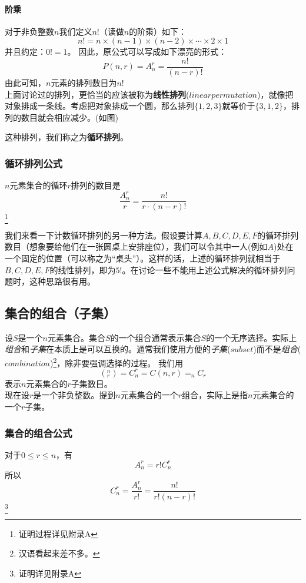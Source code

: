 \documentclass{ctexart}
\begin{document}
    \paragraph{阶乘} 对于非负整数$n$我们定义$n!$（读做$n$的阶乘）如下：
    \[n! = n \times (n-1) \times (n-2) \times \cdots \times 2 \times 1\]
    并且约定：$0! = 1$。
    因此，原公式可以写成如下漂亮的形式：
    \[P(n,r) = A_n^r = \frac{n!}{(n-r)!}\]
    由此可知，$n$元素的排列数目为$n!$\\
    上面讨论过的排列，更恰当的应该被称为\textbf{线性排列}($linear permutation$)，就像把对象排成一条线。考虑把对象排成一个圆，那么排列$\{1,2,3\}$就等价于$\{3,1,2\}$，排列的数目就会相应减少。(如图)
    \begin{center}
    \end{center}
    这种排列，我们称之为\textbf{循环排列}。
   \subsubsection{循环排列公式}
   $n$元素集合的循环$r$排列的数目是
   \[\frac{A_n^r}{r} = \frac{n!}{r \cdot (n-r)!}\]
   \footnote{证明过程详见附录A}

   我们来看一下计数循环排列的另一种方法。假设要计算$A,B,C,D,E,F$的循环排列数目（想象要给他们在一张圆桌上安排座位），我们可以令其中一人(例如$A$)处在一个固定的位置（可以称之为“桌头”）。这样的话，上述的循环排列就相当于$B,C,D,E,F$的线性排列，即为$5!$。在讨论一些不能用上述公式解决的循环排列问题时，这种思路很有用。


   \subsection{集合的组合（子集）}
   设$S$是一个$n$元素集合。集合$S$的一个组合通常表示集合$S$的一个无序选择。实际上\textit{组合}和\textit{子集}在本质上是可以互换的。通常我们使用方便的\textit{子集}($subset$)而不是\textit{组合}($combination$)\footnote{汉语看起来差不多。}，除非要强调选择的过程。
   我们用
   \[(_r^n) = C_n^r = C(n,r) = _nC_r\]
   表示$n$元素集合的$r$子集数目。\\
   现在设$r$是一个非负整数。提到$n$元素集合的一个$r$组合，实际上是指$n$元素集合的一个$r$子集。
   \subsubsection{集合的组合公式}对于$0 \leqslant r \leqslant n$，有
   \[A_n^r =r!C_n^r \]
   所以\[C_n^r = \frac{A_n^r}{r!} = \frac{n!}{r!(n-r)!}\]
   \footnote{证明详见附录A}
\end{document}
